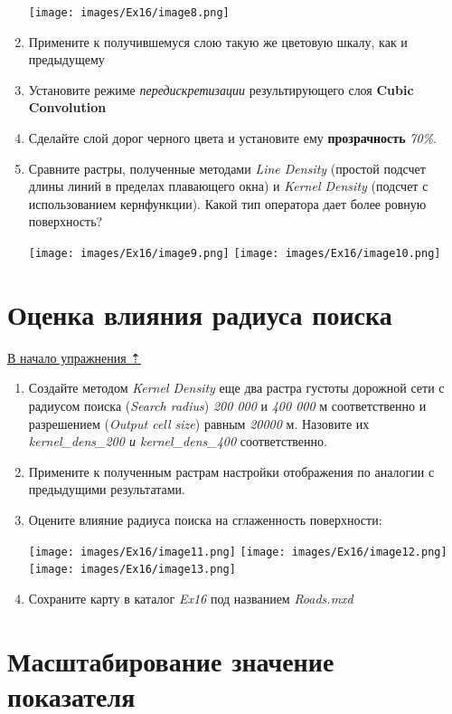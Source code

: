\documentclass[12pt,]{book}
\begin{document}
\begin{enumerate}
  \texttt{[image: images/Ex16/image8.png]}
\item
  Примените к получившемуся слою такую же цветовую шкалу, как и предыдущему
\item
  Установите режиме \emph{передискретизации} результирующего слоя \textbf{Cubic Convolution}
\item
  Сделайте слой дорог черного цвета и установите ему \textbf{прозрачность} \emph{70\%}.
\item
  Сравните растры, полученные методами \emph{Line Density} (простой подсчет длины линий в пределах плавающего окна) и \emph{Kernel Density} (подсчет с использованием кернфункции). Какой тип оператора дает более ровную поверхность?

  \texttt{[image: images/Ex16/image9.png]} \texttt{[image: images/Ex16/image10.png]}
\end{enumerate}

\hypertarget{density-analysis-radius}{%
\section{Оценка влияния радиуса поиска}\label{density-analysis-radius}}

\protect\hyperlink{density-analysis}{В начало упражнения ⇡}

\begin{enumerate}
\def\labelenumi{\arabic{enumi}.}
\item
  Создайте методом \emph{Kernel Density} еще два растра густоты дорожной сети с радиусом поиска (\emph{Search radius}) \emph{200 000} и \emph{400 000} м соответственно и разрешением (\emph{Output cell size}) равным \emph{20000} м. Назовите их \emph{kernel\_dens\_200 и kernel\_dens\_400} соответственно.
\item
  Примените к полученным растрам настройки отображения по аналогии с предыдущими результатами.
\item
  Оцените влияние радиуса поиска на сглаженность поверхности:

  \texttt{[image: images/Ex16/image11.png]} \texttt{[image: images/Ex16/image12.png]} \texttt{[image: images/Ex16/image13.png]}
\item
  Сохраните карту в каталог \emph{Ex16} под названием \emph{Roads.mxd}
\end{enumerate}

\hypertarget{density-analysis-scaling}{%
\section{Масштабирование значение показателя}\label{density-analysis-scaling}}
\end{document}
